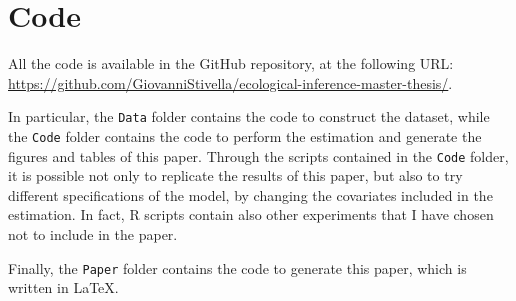 \documentclass[12pt]{paper}
\theoremstyle{definition}
\begin{document}
\newpage
\section{Code}

All the code is available in the GitHub repository, at the following URL:
\url{https://github.com/GiovanniStivella/ecological-inference-master-thesis/}.

In particular, the \texttt{Data} folder contains the code to construct the dataset, while the \texttt{Code} folder contains the code to perform the estimation and generate the figures and tables of this paper.
Through the scripts contained in the \texttt{Code} folder, it is possible not only to replicate the results of this paper, but also to try different specifications of the model, by changing the covariates included in the estimation. In fact, R scripts contain also other experiments that I have chosen not to include in the paper.

Finally, the \texttt{Paper} folder contains the code to generate this paper, which is written in \LaTeX.
\end{document}
